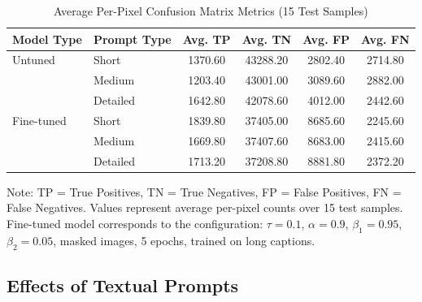 \documentclass[./dissertation.tex]{subfiles}
\begin{document}
\begin{table}[htbp]
    \centering
    \caption{Average Per-Pixel Confusion Matrix Metrics (15 Test Samples)}
    \label{tab:confusion_matrix_avg}
    \begin{tabular}{llcccc} %
        \hline
        Model Type & Prompt Type & Avg. TP & Avg. TN  & Avg. FP & Avg. FN \\
        \hline
        Untuned    & Short       & 1370.60 & 43288.20 & 2802.40 & 2714.80 \\
                   & Medium      & 1203.40 & 43001.00 & 3089.60 & 2882.00 \\
                   & Detailed    & 1642.80 & 42078.60 & 4012.00 & 2442.60 \\
        \hline
        Fine-tuned & Short       & 1839.80 & 37405.00 & 8685.60 & 2245.60 \\
                   & Medium      & 1669.80 & 37407.60 & 8683.00 & 2415.60 \\
                   & Detailed    & 1713.20 & 37208.80 & 8881.80 & 2372.20 \\
        \hline
    \end{tabular}
    \par\medskip
    \footnotesize
    Note: TP = True Positives, TN = True Negatives, FP = False Positives, FN = False Negatives. Values represent average per-pixel counts over 15 test samples. Fine-tuned model corresponds to the configuration: \( \tau = 0.1 \), \( \alpha = 0.9 \), \( \beta_1 = 0.95 \), \( \beta_2 = 0.05 \), masked images, 5 epochs, trained on long captions.
\end{table}

\subsection{Effects of Textual Prompts}
\end{document}
